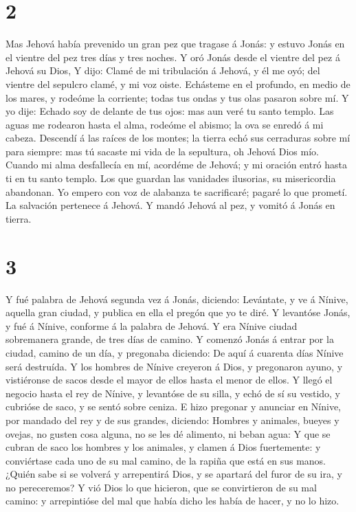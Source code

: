 \hypertarget{section-1}{%
\section{2}\label{section-1}}

 Mas Jehová había prevenido un gran pez que tragase á Jonás:
y estuvo Jonás en el vientre del pez tres días y tres noches.
 Y oró Jonás desde el vientre del pez á Jehová su Dios,
 Y dijo: Clamé de mi tribulación á Jehová, y él me oyó; del
vientre del sepulcro clamé, y mi voz oiste.  Echásteme en el
profundo, en medio de los mares, y rodeóme la corriente; todas tus ondas
y tus olas pasaron sobre mí.  Y yo dije: Echado soy de
delante de tus ojos: mas aun veré tu santo templo.  Las
aguas me rodearon hasta el alma, rodeóme el abismo; la ova se enredó á
mi cabeza.  Descendí á las raíces de los montes; la tierra
echó sus cerraduras sobre mí para siempre: mas tú sacaste mi vida de la
sepultura, oh Jehová Dios mío.  Cuando mi alma desfallecía
en mí, acordéme de Jehová; y mi oración entró hasta ti en tu santo
templo.  Los que guardan las vanidades ilusorias, su
misericordia abandonan.  Yo empero con voz de alabanza te
sacrificaré; pagaré lo que prometí. La salvación pertenece á Jehová. Y
mandó Jehová al pez, y vomitó á Jonás en tierra.

\hypertarget{section-2}{%
\section{3}\label{section-2}}

 Y fué palabra de Jehová segunda vez á Jonás, diciendo:
 Levántate, y ve á Nínive, aquella gran ciudad, y publica en
ella el pregón que yo te diré.  Y levantóse Jonás, y fué á
Nínive, conforme á la palabra de Jehová. Y era Nínive ciudad sobremanera
grande, de tres días de camino.  Y comenzó Jonás á entrar
por la ciudad, camino de un día, y pregonaba diciendo: De aquí á
cuarenta días Nínive será destruída.  Y los hombres de
Nínive creyeron á Dios, y pregonaron ayuno, y vistiéronse de sacos desde
el mayor de ellos hasta el menor de ellos.  Y llegó el
negocio hasta el rey de Nínive, y levantóse de su silla, y echó de sí su
vestido, y cubrióse de saco, y se sentó sobre ceniza.  E
hizo pregonar y anunciar en Nínive, por mandado del rey y de sus
grandes, diciendo: Hombres y animales, bueyes y ovejas, no gusten cosa
alguna, no se les dé alimento, ni beban agua:  Y que se
cubran de saco los hombres y los animales, y clamen á Dios fuertemente:
y conviértase cada uno de su mal camino, de la rapiña que está en sus
manos.  ¿Quién sabe si se volverá y arrepentirá Dios, y se
apartará del furor de su ira, y no pereceremos?  Y vió Dios
lo que hicieron, que se convirtieron de su mal camino: y arrepintióse
del mal que había dicho les había de hacer, y no lo hizo.

